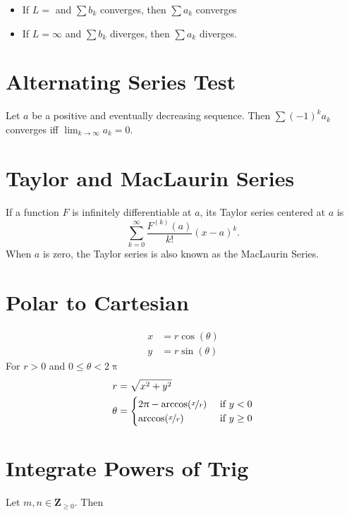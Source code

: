 \documentclass[letterpaper,9pt,fleqn]{extarticle}
\newcommand{\integers}{\mathbf{Z}}
\begin{document}
\begin{multicols*}{2}
\begin{itemize}[noitemsep]
    \item If $L = $ and $\sum b_k$  converges, then $\sum a_k $  converges
   
    \item If $L = \infty$ and $\sum b_k$ diverges, then $\sum a_k $ diverges.
    

\end{itemize}

\section*{Alternating Series Test}

Let  $a$ be a positive and eventually decreasing sequence. 
Then $\sum (-1)^k a_k$ converges iff $\lim_{k \to \infty} a_k = 0$.

\section*{Taylor and MacLaurin Series}

If a function $F$ is infinitely differentiable at $a$, its Taylor series centered at $a$ is
\begin{equation*}
  \sum_{k=0}^\infty \frac{F^{(k)}(a)}{k!}  (x-a)^k.
\end{equation*}
When $a$ is zero, the Taylor series is also known as the MacLaurin Series.
\section*{Polar to Cartesian}
\vspace{-0.25in}
\begin{minipage}[c]{0.333\textwidth}
\begin{align*}
x &= r \cos(\theta) \\
y &= r \sin(\theta)
\end{align*}
For $r > 0$ and $0 \leq \theta < 2 \uppi$
\begin{align*}
r &= \sqrt{x^2 + y^2} \\
\theta &= \begin{cases} 2 \uppi - \arccos(\nicefrac{x}{r})  & \mbox{ if } y < 0  \\
  \arccos(\nicefrac{x}{r})  & \mbox{ if } y \geq 0 
             \end{cases}    
\end{align*}
\end{minipage}      

\section*{Integrate Powers of Trig}
Let $m,n \in \integers_{\geq 0}$. Then


\end{multicols*}
\end{document}
